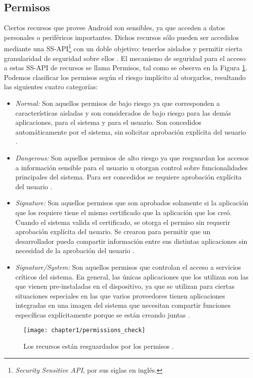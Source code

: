 \subsection{Permisos} \label{ch01-permisos}
Ciertos recursos que provee Android son sensibles, ya que acceden a datos personales o periféricos importantes. Dichos recursos sólo pueden ser accedidos mediante una SS-API\footnote{\textit{Security Sensitive API}, por sus siglas en inglés.} con un doble objetivo: tenerlos aislados y permitir cierta granularidad de seguridad sobre ellos \cite{HYGZD2014}.
El mecanismo de seguridad para el acceso a estas SS-API de recursos se llama Permisos, tal como se observa en la Figura \ref{fig:ch01:permissions-check}.\\
Podemos clasificar los permisos según el riesgo implícito al otorgarlos, resultando las siguientes cuatro categorías:
\begin{itemize}
    \item \emph{Normal:} Son aquellos permisos de bajo riesgo ya que corresponden a características aisladas y son considerados de bajo riesgo para las demás aplicaciones, para el sistema y para el usuario. Son concedidos automáticamente por el sistema, sin solicitar aprobación explícita del usuario \cite{Rom14}.
    \item \emph{Dangerous:} Son aquellos permisos de alto riesgo ya que resguardan los accesos a información sensible para el usuario u otorgan control sobre funcionalidades principales del sistema. Para ser concedidos se requiere aprobación explícita del usuario \cite{Rom14}. 
    \item \emph{Signature:} Son aquellos permisos que son aprobados solamente si la aplicación que los requiere tiene el mismo certificado que la aplicación que los creó. Cuando el sistema valida el certificado, se otorga el permiso sin requerir aprobación explícita del usuario. Se crearon para permitir que un desarrollador pueda compartir información entre sus distintas aplicaciones sin necesidad de la aprobación del usuario \cite{Rom14}.
    \item \emph{Signature/System:} Son aquellos permisos que controlan el acceso a servicios críticos del sistema. En general, las únicas aplicaciones que los utilizan son las que vienen pre-instaladas en el dispositivo, ya que se utilizan para ciertas situaciones especiales en las que varios proveedores tienen aplicaciones integradas en una imagen del sistema que necesitan compartir funciones específicas explícitamente porque se están creando juntas \cite{Rom14}.
\end{itemize}
\begin{figure}[hbtp]
	\begin{center}
		\texttt{[image: chapter1/permissions\_check]}
		\caption{Los recursos están resguardados por los permisos \cite{aossec}.}
		\label{fig:ch01:permissions-check}
	\end{center}
\end{figure}
\newpage
